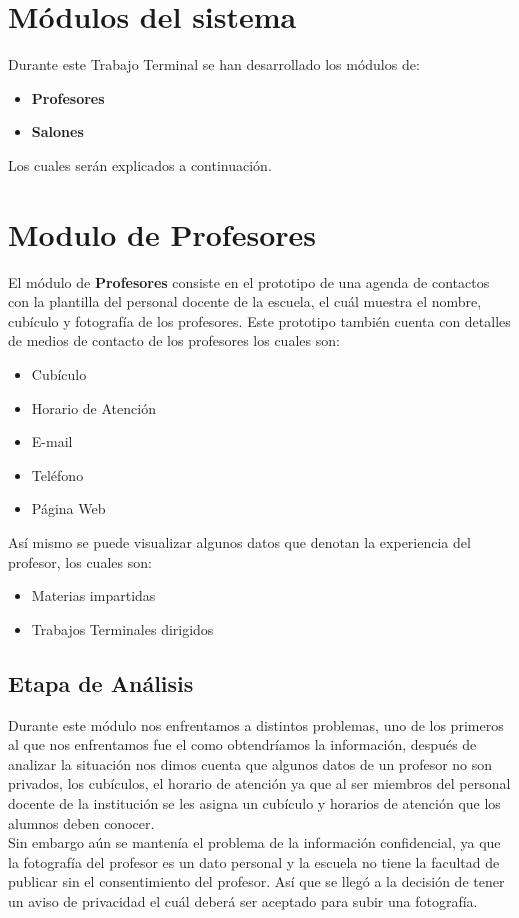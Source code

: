 \section{Módulos del sistema}
	Durante este Trabajo Terminal  se han desarrollado los módulos de:
	\begin{itemize}
		\item \textbf{Profesores}
		\item \textbf{Salones}
	\end{itemize}
Los cuales serán explicados a continuación.
\section{Modulo de Profesores}	El módulo de \textbf{Profesores} consiste en el prototipo de una agenda de contactos con la plantilla del personal docente de la escuela, el cuál muestra el nombre, cubículo y fotografía de los profesores. Este prototipo también cuenta con detalles de medios de contacto de los profesores los cuales son:
	\begin{itemize}
		\item Cubículo
		\item Horario de Atención
		\item E-mail
		\item Teléfono
		\item Página Web
	\end{itemize}
	Así mismo se puede visualizar algunos datos que denotan la experiencia del profesor, los cuales son:
	\begin{itemize}
		\item Materias impartidas
		\item Trabajos Terminales dirigidos
	\end{itemize} 
	\subsection{Etapa de Análisis}
	Durante este módulo nos enfrentamos a distintos problemas, uno de los primeros al que nos enfrentamos fue el como obtendríamos la información, después de analizar la situación nos dimos cuenta que algunos datos de un profesor no son privados, los cubículos, el horario de atención ya que al ser miembros del personal docente de la institución se les asigna un cubículo y horarios de atención que los alumnos deben conocer. \\
	
	 Sin embargo aún se mantenía el problema de la  información confidencial, ya que la fotografía del profesor es un dato personal y  la escuela no tiene la facultad de publicar sin el consentimiento del profesor. Así que se llegó a la decisión de tener un aviso de privacidad el cuál deberá ser aceptado para subir una fotografía.\\
	 

